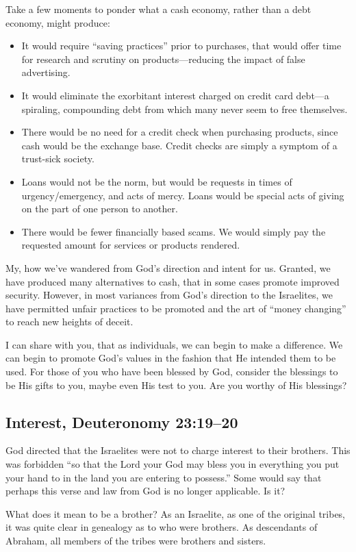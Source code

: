 \documentclass[12pt]{memoir}
\begin{document}
Take a few moments to ponder what a cash economy, rather than a debt
economy, might produce: 
\begin{itemize}
\item It would require ``saving practices'' prior to purchases, that would
offer time for research and scrutiny on products---reducing the impact
of false advertising. 
\item It would eliminate the exorbitant interest charged on credit card
debt---a spiraling, compounding debt from which many never seem to
free themselves. 
\item There would be no need for a credit check when purchasing products,
since cash would be the exchange base. Credit checks are simply a
symptom of a trust-sick society. 
\item Loans would not be the norm, but would be requests in times of urgency\slash{}emergency,
and acts of mercy. Loans would be special acts of giving on the part
of one person to another. 
\item There would be fewer financially based scams. We would simply pay
the requested amount for services or products rendered. 
\end{itemize}
My, how we've wandered from God's direction and intent for us. Granted,
we have produced many alternatives to cash, that in some cases promote
improved security. However, in most variances from God's direction
to the Israelites, we have permitted unfair practices to be promoted
and the art of ``money changing'' to reach new heights of deceit. 

I can share with you, that as individuals, we can begin to make a
difference. We can begin to promote God's values in the fashion that
He intended them to be used. For those of you who have been blessed
by God, consider the blessings to be His gifts to you, maybe even
His test to you. Are you worthy of His blessings? 

\subsection{Interest, Deuteronomy 23:19--20}

God directed that the Israelites were not to charge interest to their
brothers. This was forbidden ``so that the Lord your God may bless
you in everything you put your hand to in the land you are entering
to possess.'' Some would say that perhaps this verse and law from
God is no longer applicable. Is it?

What does it mean to be a brother? As an Israelite, as one of the
original tribes, it was quite clear in genealogy as to who were brothers.
As descendants of Abraham, all members of the tribes were brothers
and sisters. 
\end{document}
